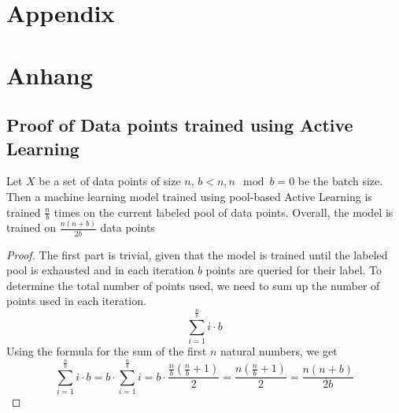 
{\chapter{Appendix}}    %
{\chapter{Anhang}}      %
\label{chap:appendix}


\section{Proof of Data points trained using Active Learning}
\label{sec:appendix:FirstSection}
\begin{theorem}
Let $X$ be a set of data points of size $n$, $b < n, n \mod b = 0$ be the batch size. Then a machine learning model trained
using pool-based Active Learning is trained $\frac{n}{b}$ times on the current labeled pool of data points. Overall, the model
is trained on $\frac{n(n+b)}{2b}$ data points
\end{theorem}
\begin{proof}
    The first part is trivial, given that the model is trained until the labeled pool is exhausted and in each iteration $b$
    points are queried for their label. To determine the total number of points used, we need to sum up the number of points
    used in each iteration. 
    \begin{equation}
        \sum_{i=1}^{\frac{n}{b}} i \cdot b
    \end{equation}
    Using the formula for the sum of the first $n$ natural numbers, we get
    \begin{equation}
        \sum_{i=1}^{\frac{n}{b}} i \cdot b = b \cdot \sum_{i=1}^{\frac{n}{b}} i = b \cdot \frac{\frac{n}{b} (\frac{n}{b} + 1)}{2}
        = \frac{n (\frac{n}{b} + 1)}{2} = \frac{n(n+b)}{2b}
    \end{equation}
\end{proof}
		
